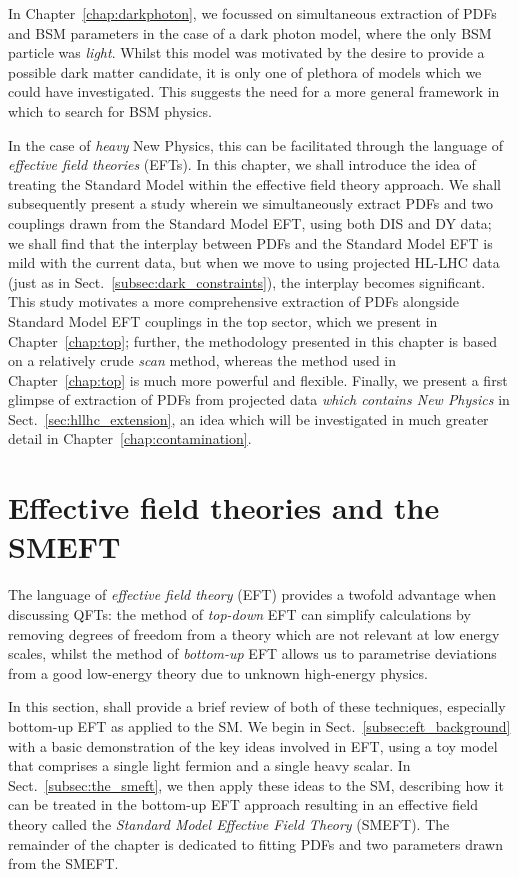 \documentclass[withindex,glossary]{cam-thesis}
\begin{document}
\noindent In Chapter~\ref{chap:darkphoton}, we focussed on simultaneous extraction of PDFs and BSM parameters in the case of a dark photon model, where the only BSM particle was \textit{light}. Whilst this model was motivated by the desire to provide a possible dark matter candidate, it is only one of plethora of models which we could have investigated. This suggests the need for a more general framework in which to search for BSM physics.

In the case of \textit{heavy} New Physics, this can be facilitated through the language of \textit{effective field theories} (EFTs). In this chapter, we shall introduce the idea of treating the Standard Model within the effective field theory approach. We shall subsequently present a study wherein we simultaneously extract PDFs and two couplings drawn from the Standard Model EFT, using both DIS and DY data; we shall find that the interplay between PDFs and the Standard Model EFT is mild with the current data, but when we move to using projected HL-LHC data (just as in Sect.~\ref{subsec:dark_constraints}), the interplay becomes significant. This study motivates a more comprehensive extraction of PDFs alongside Standard Model EFT couplings in the top sector, which we present in Chapter~\ref{chap:top}; further, the methodology presented in this chapter is based on a relatively crude \textit{scan} method, whereas the method used in Chapter~\ref{chap:top} is much more powerful and flexible. Finally, we present a first glimpse of extraction of PDFs from projected data \textit{which contains New Physics} in Sect.~\ref{sec:hllhc_extension}, an idea which will be investigated in much greater detail in Chapter~\ref{chap:contamination}.

\section{Effective field theories and the SMEFT}
\label{sec:eft_intro}
The language of \textit{effective field theory} (EFT) provides a twofold advantage when discussing QFTs: the method of \textit{top-down} EFT can simplify calculations by removing degrees of freedom from a theory which are not relevant at low energy scales, whilst the method of \textit{bottom-up} EFT allows us to parametrise deviations from a good low-energy theory due to unknown high-energy physics. 

In this section, shall provide a brief review of both of these techniques, especially bottom-up EFT as applied to the SM. We begin in Sect.~\ref{subsec:eft_background} with a basic demonstration of the key ideas involved in EFT, using a toy model that comprises a single light fermion and a single heavy scalar. In Sect.~\ref{subsec:the_smeft}, we then apply these ideas to the SM, describing how it can be treated in the bottom-up EFT approach resulting in an effective field theory called the \textit{Standard Model Effective Field Theory} (SMEFT). The remainder of the chapter is dedicated to fitting PDFs and two parameters drawn from the SMEFT.
\end{document}
